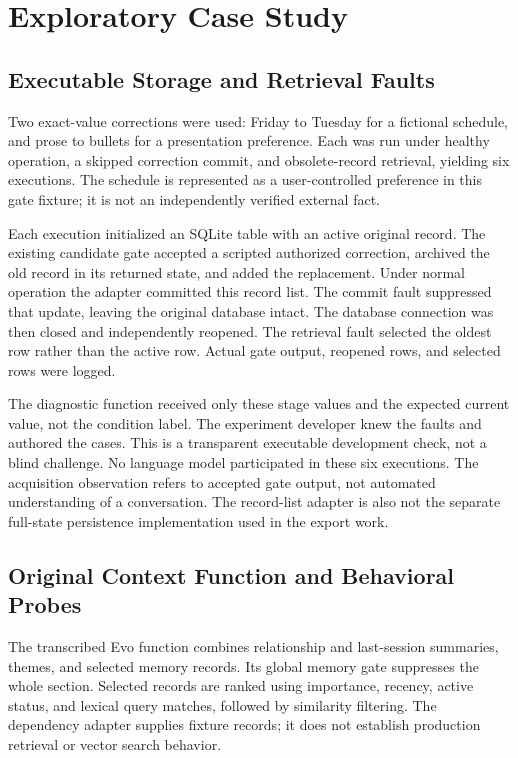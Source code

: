 \documentclass[runningheads]{llncs}
\begin{document}
\section{Exploratory Case Study}
\subsection{Executable Storage and Retrieval Faults}
Two exact-value corrections were used: Friday to Tuesday for a fictional schedule, and prose to bullets for a presentation preference. Each was run under healthy operation, a skipped correction commit, and obsolete-record retrieval, yielding six executions. The schedule is represented as a user-controlled preference in this gate fixture; it is not an independently verified external fact.

Each execution initialized an SQLite table with an active original record. The existing candidate gate accepted a scripted authorized correction, archived the old record in its returned state, and added the replacement. Under normal operation the adapter committed this record list. The commit fault suppressed that update, leaving the original database intact. The database connection was then closed and independently reopened. The retrieval fault selected the oldest row rather than the active row. Actual gate output, reopened rows, and selected rows were logged.

The diagnostic function received only these stage values and the expected current value, not the condition label. The experiment developer knew the faults and authored the cases. This is a transparent executable development check, not a blind challenge. No language model participated in these six executions. The acquisition observation refers to accepted gate output, not automated understanding of a conversation. The record-list adapter is also not the separate full-state persistence implementation used in the export work.

\subsection{Original Context Function and Behavioral Probes}
The transcribed Evo function combines relationship and last-session summaries, themes, and selected memory records. Its global memory gate suppresses the whole section. Selected records are ranked using importance, recency, active status, and lexical query matches, followed by similarity filtering. The dependency adapter supplies fixture records; it does not establish production retrieval or vector search behavior.
\end{document}
